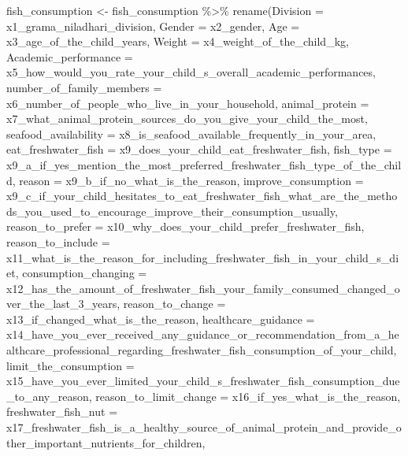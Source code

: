 \documentclass[
]{article}
\newenvironment{Shaded}{\begin{snugshade}}{\end{snugshade}}
\newcommand{\AttributeTok}[1]{\textcolor[rgb]{0.77,0.63,0.00}{#1}}
\newcommand{\FunctionTok}[1]{\textcolor[rgb]{0.00,0.00,0.00}{#1}}
\newcommand{\NormalTok}[1]{#1}
\newcommand{\OtherTok}[1]{\textcolor[rgb]{0.56,0.35,0.01}{#1}}
\newcommand{\SpecialCharTok}[1]{\textcolor[rgb]{0.00,0.00,0.00}{#1}}
\begin{document}
\begin{Shaded}
\begin{Highlighting}[]
\NormalTok{fish\_consumption }\OtherTok{\textless{}{-}}\NormalTok{ fish\_consumption }\SpecialCharTok{\%\textgreater{}\%}
\FunctionTok{rename}\NormalTok{(}\AttributeTok{Division =}\NormalTok{ x1\_grama\_niladhari\_division,}
       \AttributeTok{Gender =}\NormalTok{ x2\_gender,}
       \AttributeTok{Age =}\NormalTok{ x3\_age\_of\_the\_child\_years,}
       \AttributeTok{Weight =}\NormalTok{ x4\_weight\_of\_the\_child\_kg,}
       \AttributeTok{Academic\_performance =}\NormalTok{ x5\_how\_would\_you\_rate\_your\_child\_s\_overall\_academic\_performances,}
       \AttributeTok{number\_of\_family\_members =}\NormalTok{ x6\_number\_of\_people\_who\_live\_in\_your\_household,}
       \AttributeTok{animal\_protein =}\NormalTok{  x7\_what\_animal\_protein\_sources\_do\_you\_give\_your\_child\_the\_most,}
       \AttributeTok{seafood\_availability =}\NormalTok{ x8\_is\_seafood\_available\_frequently\_in\_your\_area,}
       \AttributeTok{eat\_freshwater\_fish =}\NormalTok{ x9\_does\_your\_child\_eat\_freshwater\_fish,}
       \AttributeTok{fish\_type =}\NormalTok{ x9\_a\_if\_yes\_mention\_the\_most\_preferred\_freshwater\_fish\_type\_of\_the\_child,}
       \AttributeTok{reason =}\NormalTok{ x9\_b\_if\_no\_what\_is\_the\_reason,}
       \AttributeTok{improve\_consumption =}\NormalTok{ x9\_c\_if\_your\_child\_hesitates\_to\_eat\_freshwater\_fish\_what\_are\_the\_methods\_you\_used\_to\_encourage\_improve\_their\_consumption\_usually,}
       \AttributeTok{reason\_to\_prefer =}\NormalTok{ x10\_why\_does\_your\_child\_prefer\_freshwater\_fish,}
       \AttributeTok{reason\_to\_include =}\NormalTok{  x11\_what\_is\_the\_reason\_for\_including\_freshwater\_fish\_in\_your\_child\_s\_diet,}
       \AttributeTok{consumption\_changing =}\NormalTok{ x12\_has\_the\_amount\_of\_freshwater\_fish\_your\_family\_consumed\_changed\_over\_the\_last\_3\_years,}
       \AttributeTok{reason\_to\_change =}\NormalTok{ x13\_if\_changed\_what\_is\_the\_reason,}
       \AttributeTok{healthcare\_guidance =}\NormalTok{ x14\_have\_you\_ever\_received\_any\_guidance\_or\_recommendation\_from\_a\_healthcare\_professional\_regarding\_freshwater\_fish\_consumption\_of\_your\_child,}
       \AttributeTok{limit\_the\_consumption =}\NormalTok{ x15\_have\_you\_ever\_limited\_your\_child\_s\_freshwater\_fish\_consumption\_due\_to\_any\_reason,}
       \AttributeTok{reason\_to\_limit\_change =}\NormalTok{ x16\_if\_yes\_what\_is\_the\_reason,}
       \AttributeTok{freshwater\_fish\_nut =}\NormalTok{ x17\_freshwater\_fish\_is\_a\_healthy\_source\_of\_animal\_protein\_and\_provide\_other\_important\_nutrients\_for\_children,}

\end{Highlighting}
\end{Shaded}
\end{document}
